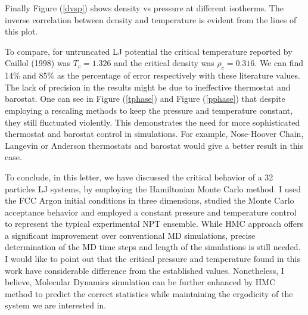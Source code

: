 \documentclass[aps,prl,reprint]{revtex4-1}
\begin{document}
Finally Figure (\ref{dvsp}) shows density vs pressure at different isotherms. The inverse correlation between density and temperature is evident from the lines of this plot.

To compare, for untruncated LJ potential the critical temperature reported by Caillol (1998) was $T_c=1.326$ and the critical density was $\rho_c=0.316$. \cite{Caillol1998} We can find 14\% and 85\% as the percentage of error respectively with these literature values. The lack of precision in the results might be due to ineffective thermostat and barostat. One can see in Figure (\ref{tphase}) and Figure (\ref{pphase}) that despite employing a rescaling methods to keep the pressure and temperature constant, they still fluctuated violently. This demonstrates the need for more sophisticated thermostat and barostat control in simulations. For example, Nose-Hoover Chain, Langevin or Anderson thermostats and barostat would give a better result in this case.
\newline

To conclude, in this letter, we have discussed the critical behavior of a 32 particles LJ systems, by employing the Hamiltonian Monte Carlo method. I used the FCC Argon initial conditions in three dimensions, studied the Monte Carlo acceptance behavior and employed a constant pressure and temperature control to represent the typical experimental NPT ensemble. While HMC approach offers a significant improvement over conventional MD simulations, precise determination of the MD time steps and length of the simulations is still needed. I would like to point out that the critical pressure and temperature found in this work have considerable difference from the established values. Nonetheless, I believe, Molecular Dynamics simulation can be further enhanced by HMC method to predict the correct statistics while maintaining the ergodicity of the system we are interested in.




\end{document}
